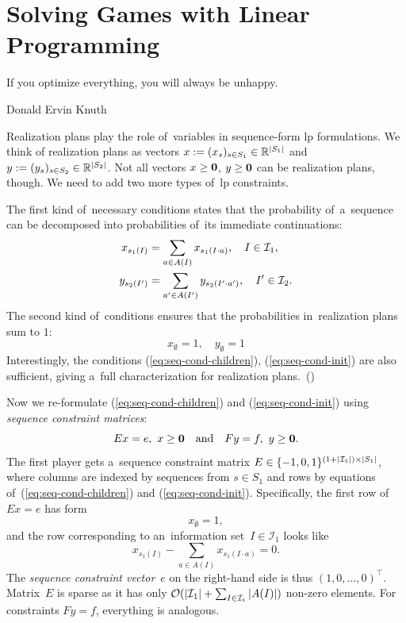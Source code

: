 \section{Solving Games with Linear Programming}
{
  \setlength{\epigraphwidth}{0.65\textwidth}
  \epigraph{
    If you optimize everything, you will always be unhappy.
  }{Donald Ervin Knuth}
}%
Realization plans play the role of~variables in sequence-form \acrshort{lp} formulations.
We think of realization plans as vectors
$x := (x_s) _{s\in S_1} \in \mathbb{R} ^{\left\vert S_1 \right\vert}$
and
$y := (y_s) _{s\in S_2} \in \mathbb{R} ^{\left\vert S_2 \right\vert}$.
Not all vectors $x \ge \boldsymbol{0}$, $y \ge \boldsymbol{0}$ can be realization plans, though.
We need to add two more types of~\acrshort{lp} constraints.

The first kind of~necessary conditions states that the probability of~a~sequence can be decomposed into probabilities of~its immediate continuations:
\begin{align}
  \label{eq:seq-cond-children}
  \begin{split}
    x_{s_1(I)} &= \sum _{a \in A(I)}    x_{s_1(I \cdot a)}, \quad I\in\mathcal{I}_1, \\
    y_{s_2(I')} &= \sum _{a' \in A(I')} y_{s_2(I' \cdot a')}, \quad I'\in\mathcal{I}_2.
  \end{split}
\end{align}
The second kind of~conditions ensures that the probabilities in~realization plans sum to $1$:
\begin{equation}
  \label{eq:seq-cond-init}
  x_{\emptyset} = 1, \quad y_{\emptyset} = 1
\end{equation}
Interestingly, the conditions (\ref{eq:seq-cond-children}), (\ref{eq:seq-cond-init}) are also sufficient, giving a~full characterization for realization plans.~(\cite[Proposition~3.10, p.~71]{AGT07})

Now we re-formulate (\ref{eq:seq-cond-children}) and (\ref{eq:seq-cond-init}) using \emph{sequence constraint matrices}:
\begin{equation}
  \label{eq:seq-constraints}
  Ex = e, \ x \ge \boldsymbol{0}
  \quad \textrm{and} \quad
  Fy = f, \ y \ge \boldsymbol{0}.
\end{equation}
The first player gets a~sequence constraint matrix $E \in \{-1, 0, 1\} ^{(1 + \left\vert \mathcal{I}_1 \right\vert) \times \left\vert S_1 \right\vert}$, where columns are indexed by sequences from $s\in S_1$ and rows by equations of~(\ref{eq:seq-cond-children}) and (\ref{eq:seq-cond-init}).
Specifically, the first row of $Ex = e$ has form
\[
  x _{\emptyset} = 1,
\]
and the row corresponding to an~information set~$I \in \mathcal{I}_1$ looks like
\[
    x _{s_1 (I)} - \sum _{a \in A(I)} x _{s_1(I \cdot a)} = 0.
\]
The \emph{sequence constraint vector}~$e$ on the right-hand side is thus $(1, 0, \dots, 0) ^\top$.
Matrix~$E$ is sparse as it has only $\mathcal{O}(\left\vert \mathcal{I}_1 \right\vert + \sum_{I\in\mathcal{I}_i} \left\vert A(I) \right\vert)$ non-zero elements.
For constraints $Fy = f$, everything is analogous.

